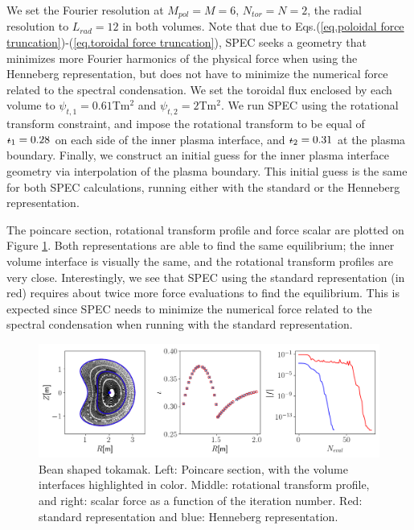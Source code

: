 \documentclass[my_thesis.tex]{subfiles}
\begin{document}
We set the Fourier resolution at $M_{pol}=M=6$, $N_{tor}=N=2$, the radial resolution to $L_{rad}=12$ in both volumes. Note that due to Eqs.(\ref{eq.poloidal force truncation})-(\ref{eq.toroidal force truncation}), SPEC seeks a geometry that minimizes more Fourier harmonics of the physical force when using the Henneberg representation, but does not have to minimize the numerical force related to the spectral condensation. We set the toroidal flux enclosed by each volume to $\psi_{t,1}=0.61$Tm${}^2$ and $\psi_{t,2}=2$Tm${}^2$. We run SPEC using the rotational transform constraint, and impose the rotational transform to be equal of $\text{$\iota\!\!$-}_1=0.28$ on each side of the inner plasma interface, and $\text{$\iota\!\!$-}_2=0.31$ at the plasma boundary. Finally, we construct an initial guess for the inner plasma interface geometry via interpolation of the plasma boundary. This initial guess is the same for both SPEC calculations, running either with the standard or the Henneberg representation.

The poincare section, rotational transform profile and force scalar are plotted on Figure \ref{fig. bean shape henneberg representation}. Both representations are able to find the same equilibrium; the inner volume interface is visually the same, and the rotational transform profiles are very close. Interestingly, we see that SPEC using the standard representation (in red) requires about twice more force evaluations to find the equilibrium. This is expected since SPEC needs to minimize the numerical force related to the spectral condensation when running with the standard representation. 

\begin{figure}
	\centering
	\includegraphics[width=\linewidth]{images/HennebergRepresentation/BeanShape.png}
	\caption{Bean shaped tokamak. Left: Poincare section, with the volume interfaces highlighted in color. Middle: rotational transform profile, and right: scalar force as a function of the iteration number. Red: standard representation and blue: Henneberg representation.}
	\label{fig. bean shape henneberg representation}
\end{figure}
\end{document}
